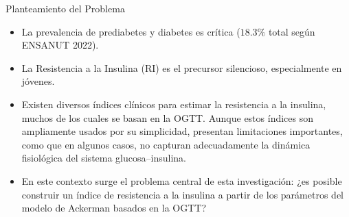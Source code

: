 \documentclass{beamer}
\begin{document}
    \begin{frame}{Planteamiento del Problema}
        \justifying
		\begin{itemize}
		    \item La prevalencia de prediabetes y diabetes es crítica ($18.3 \%$ total según ENSANUT 2022).
            \vspace{0.2cm}
            \item La Resistencia a la Insulina (RI) es el precursor silencioso, especialmente en jóvenes.
            \vspace{0.2cm}
            \item Existen diversos índices clínicos para estimar la resistencia a la insulina, muchos de los cuales se basan en la OGTT. Aunque estos índices son ampliamente usados por su simplicidad, presentan limitaciones importantes, como que %
            en algunos casos, no capturan adecuadamente la dinámica fisiológica del sistema glucosa–insulina.
            \vspace{0.2cm}
            \item En este contexto surge el problema central de esta investigación: ¿es posible construir un índice de resistencia a la insulina a partir de los parámetros del modelo de Ackerman basados en la OGTT?
		\end{itemize}

        \vspace{0.2cm}

	\end{frame}

\end{document}
